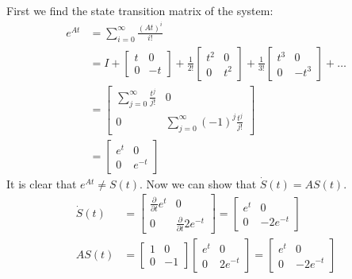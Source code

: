 \documentclass[11pt]{article}
\begin{document}
\subparagraph*{}
First we find the state transition matrix of the system:
\begin{align*}
	e^{At} &= \sum_{i=0}^\infty \frac{(At)^i}{i!} \\
	&= I + \begin{bmatrix} t & 0 \\ 0 & -t \end{bmatrix} + \frac{1}{2!} \begin{bmatrix} t^2 & 0 \\ 0 & t^2 \end{bmatrix} + \frac{1}{3!} \begin{bmatrix} t^3 & 0 \\ 0 & -t^3 \end{bmatrix} + \dots \\
	&= \begin{bmatrix} \sum_{j=0}^\infty \frac{t^j}{j!} & 0 \\ 0 & \sum_{j=0}^\infty (-1)^j\frac{t^j}{j!} \end{bmatrix} \\
	&= \begin{bmatrix} e^t & 0 \\ 0 & e^{-t} \end{bmatrix}
\end{align*}
It is clear that $e^{At} \neq S(t)$. Now we can show that $\dot{S}(t) = AS(t)$. 
\begin{align*}
	\dot{S}(t) &= \begin{bmatrix} \frac{\partial}{\partial t} e^t & 0 \\ 0 & \frac{\partial}{\partial t} 2e^{-t} \end{bmatrix} = \begin{bmatrix} e^t & 0 \\ 0 & -2e^{-t} \end{bmatrix} \\
	AS(t) &= \begin{bmatrix} 1 & 0 \\ 0 & -1 \end{bmatrix} \begin{bmatrix} e^t & 0 \\ 0 & 2e^{-t} \end{bmatrix} = \begin{bmatrix} e^t & 0 \\ 0 & -2e^{-t} \end{bmatrix}
\end{align*}
\end{document}
